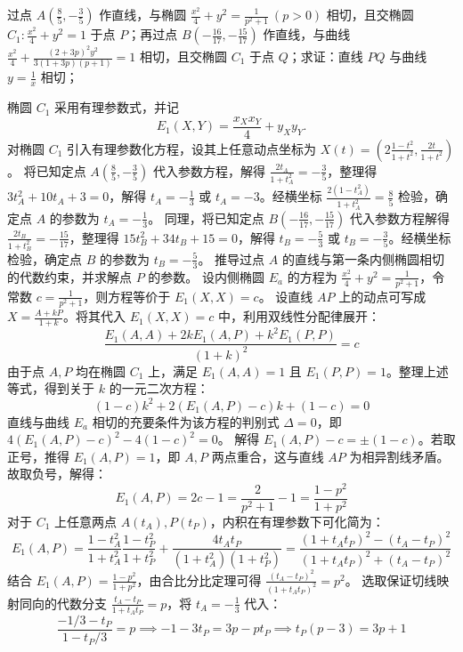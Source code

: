 \begin{example}
过点 \(A\left(\frac{8}{5}, -\frac{3}{5}\right)\) 作直线，与椭圆 \(\frac{x^2}{4} + y^2 = \frac{1}{p^2 + 1}\ (p > 0)\) 相切，且交椭圆 \(C_1: \frac{x^2}{4} + y^2 = 1\) 于点 \(P\)；再过点 \(B\left(-\frac{16}{17}, -\frac{15}{17}\right)\) 作直线，与曲线 \(\frac{x^2}{4} + \frac{(2 + 3p)^2 y^2}{3(1 + 3p)(p + 1)} = 1\) 相切，且交椭圆 \(C_1\) 于点 \(Q\)；求证：直线 \(PQ\) 与曲线 \(y = \frac{1}{x}\) 相切；
\end{example}
\begin{solution}
椭圆 $C_1$ 采用有理参数式，并记
\[ E_1(X,Y) = \frac{x_X x_Y}{4} + y_X y_Y. \]
对椭圆 $C_1$ 引入有理参数化方程，设其上任意动点坐标为 $X(t) = \left(2\frac{1-t^2}{1+t^2}, \frac{2t}{1+t^2}\right)$。
将已知定点 $A\left(\frac{8}{5}, -\frac{3}{5}\right)$ 代入参数方程，解得 $\frac{2t_A}{1+t_A^2} = -\frac{3}{5}$，整理得 $3t_A^2 + 10t_A + 3 = 0$，解得 $t_A = -\frac{1}{3}$ 或 $t_A = -3$。经横坐标 $\frac{2(1-t_A^2)}{1+t_A^2} = \frac{8}{5}$ 检验，确定点 $A$ 的参数为 $t_A = -\frac{1}{3}$。
同理，将已知定点 $B\left(-\frac{16}{17}, -\frac{15}{17}\right)$ 代入参数方程解得 $\frac{2t_B}{1+t_B^2} = -\frac{15}{17}$，整理得 $15t_B^2 + 34t_B + 15 = 0$，解得 $t_B = -\frac{5}{3}$ 或 $t_B = -\frac{3}{5}$。经横坐标检验，确定点 $B$ 的参数为 $t_B = -\frac{5}{3}$。
推导过点 $A$ 的直线与第一条内侧椭圆相切的代数约束，并求解点 $P$ 的参数。
设内侧椭圆 $E_a$ 的方程为 $\frac{x^2}{4} + y^2 = \frac{1}{p^2+1}$，令常数 $c = \frac{1}{p^2+1}$，则方程等价于 $E_1(X,X) = c$。
设直线 $AP$ 上的动点可写成 $X = \frac{A + kP}{1+k}$。将其代入 $E_1(X,X) = c$ 中，利用双线性分配律展开：
$$ \frac{E_1(A,A) + 2k E_1(A,P) + k^2 E_1(P,P)}{(1+k)^2} = c $$
由于点 $A, P$ 均在椭圆 $C_1$ 上，满足 $E_1(A,A) = 1$ 且 $E_1(P,P) = 1$。整理上述等式，得到关于 $k$ 的一元二次方程：
$$ (1-c)k^2 + 2(E_1(A,P) - c)k + (1-c) = 0 $$
直线与曲线 $E_a$ 相切的充要条件为该方程的判别式 $\Delta = 0$，即 $4(E_1(A,P) - c)^2 - 4(1-c)^2 = 0$。
解得 $E_1(A,P) - c = \pm (1-c)$。若取正号，推得 $E_1(A,P) = 1$，即 $A, P$ 两点重合，这与直线 $AP$ 为相异割线矛盾。故取负号，解得：
$$ E_1(A,P) = 2c - 1 = \frac{2}{p^2+1} - 1 = \frac{1-p^2}{1+p^2} $$
对于 $C_1$ 上任意两点 $A(t_A), P(t_P)$，内积在有理参数下可化简为：
$$ E_1(A,P) = \frac{1-t_A^2}{1+t_A^2}\frac{1-t_P^2}{1+t_P^2} + \frac{4t_A t_P}{(1+t_A^2)(1+t_P^2)} = \frac{(1+t_A t_P)^2 - (t_A-t_P)^2}{(1+t_A t_P)^2 + (t_A-t_P)^2} $$
结合 $E_1(A,P) = \frac{1-p^2}{1+p^2}$，由合比分比定理可得 $\frac{(t_A-t_P)^2}{(1+t_A t_P)^2} = p^2$。
选取保证切线映射同向的代数分支 $\frac{t_A - t_P}{1 + t_A t_P} = p$，将 $t_A = -\frac{1}{3}$ 代入：
$$ \frac{-1/3 - t_P}{1 - t_P/3} = p \implies -1 - 3t_P = 3p - p t_P \implies t_P(p-3) = 3p+1 $$

\end{solution}

